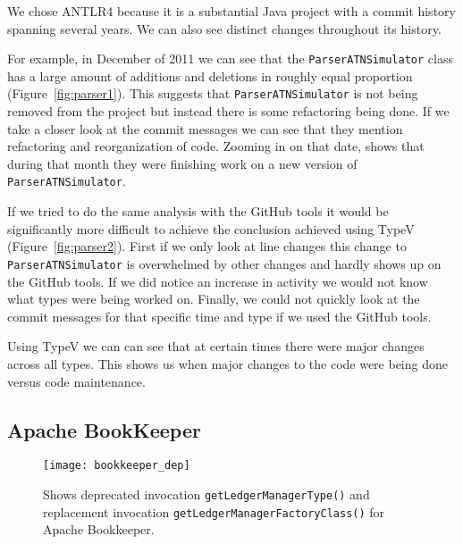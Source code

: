 We chose ANTLR4 because it is a substantial Java project with a commit history spanning several years. We can also see distinct changes throughout its history.

For example, in December of 2011 we can see that the \texttt{ParserATNSimulator} class has a large amount of additions and deletions in roughly equal proportion (Figure~\ref{fig:parser1}). This suggests that \texttt{ParserATNSimulator} is not being removed from the project but instead there is some refactoring being done. If we take a closer look at the commit messages we can see that they mention refactoring and reorganization of code. Zooming in on that date,  shows that during that month they were finishing work on a new version of \texttt{ParserATNSimulator}.

If we tried to do the same analysis with the GitHub tools it would be significantly more difficult to achieve the conclusion achieved using TypeV (Figure~\ref{fig:parser2}). First if we only look at line changes this change to \texttt{ParserATNSimulator} is overwhelmed by other changes and hardly shows up on the GitHub tools. If we did notice an increase in activity we would not know what types were being worked on. Finally, we could not quickly look at the commit messages for that specific time and type if we used the GitHub tools.

Using TypeV we can can see that at certain times there were major changes across all types. This shows us when major changes to the code were being done versus code maintenance. 

\subsection{Apache BookKeeper}

\begin{figure}[!ht]
\centering
\texttt{[image: bookkeeper\_dep]}
\caption{Shows deprecated invocation \texttt{getLedgerManagerType()} and replacement invocation \texttt{getLedgerManagerFactoryClass()} for Apache Bookkeeper.}
\label{fig:bookkeeper-depr}
\end{figure}

